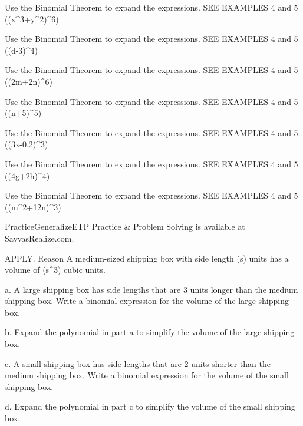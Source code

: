 \documentclass{article}
\newenvironment{practice}[2]{}{}        %
\newenvironment{te-addendum}[2]{}{}     %
\newcommand{\answer}[1]{}               %
\newcommand{\placeholder}[2]{}          %
\begin{document}
\begin{practice}{59}{1}
Use the Binomial Theorem to expand the expressions. SEE EXAMPLES 4 and 5
((x^3+y^2)^6)
\answer{(x^{18}+6x^{15}y^2+15x^{12}y^4+20x^9y^6+15x^6y^8+6x^3y^{10}+y^{12})}
\end{practice}
\begin{practice}{60}{1}
Use the Binomial Theorem to expand the expressions. SEE EXAMPLES 4 and 5
((d-3)^4)
\answer{(d^4-12d^3+54d^2-108d+81)}
\end{practice}
\begin{practice}{61}{1}
Use the Binomial Theorem to expand the expressions. SEE EXAMPLES 4 and 5
((2m+2n)^6)
\answer{(64m^6+384m^5n+960m^4n^2+1,280m^3n^3+960m^2n^4+384mn^5+64n^6)}
\end{practice}
\begin{practice}{62}{1}
Use the Binomial Theorem to expand the expressions. SEE EXAMPLES 4 and 5
((n+5)^5)
\answer{(n^5+25n^4+250n^3+1,250n^2+3,125n+3125)}
\end{practice}
\begin{practice}{63}{1}
Use the Binomial Theorem to expand the expressions. SEE EXAMPLES 4 and 5
((3x-0.2)^3)
\answer{(27x^3-5.4x^2+0.36x-0.008)}
\end{practice}
\begin{practice}{64}{1}
Use the Binomial Theorem to expand the expressions. SEE EXAMPLES 4 and 5
((4g+2h)^4)
\answer{(256g^4+512g^3h+384g^2h^2+128gh^3+16h^4)}
\end{practice}
\begin{practice}{65}{1}
Use the Binomial Theorem to expand the expressions. SEE EXAMPLES 4 and 5
((m^2+\frac12n)^3)
\answer{(m^6+\frac32m^4n+\frac34m^2n^2+\frac18n^3)}
\end{practice}
\begin{te-addendum}{Practice}{GeneralizeETP}
Practice \& Problem Solving is available at SavvasRealize.com.
\end{te-addendum}
\begin{practice}{66}{3}
APPLY. Reason A medium-sized shipping box with side length (s) units has a volume of (s^3) cubic units.
\placeholder{illustration}{Three brown cardboard shipping boxes labeled DORM: an open medium box containing dorm supplies has all three visible dimensions labeled s; a small closed box rests on a large closed box to its right.}
a. A large shipping box has side lengths that are 3 units longer than the medium shipping box. Write a binomial expression for the volume of the large shipping box.
\answer{a. ((s+3)^3)}
b. Expand the polynomial in part a to simplify the volume of the large shipping box.
\answer{b. (s^3+9s^2+27s+27)}
c. A small shipping box has side lengths that are 2 units shorter than the medium shipping box. Write a binomial expression for the volume of the small shipping box.
\answer{c. ((s-2)^3)}
d. Expand the polynomial in part c to simplify the volume of the small shipping box.
\answer{d. (s^3-6s^2+12s-8)}
\end{practice}
\end{document}
